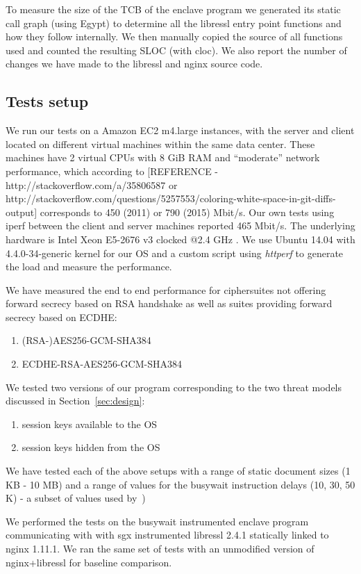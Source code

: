 \documentclass[../main.tex]{subfiles}
\begin{document}
To measure the size of the TCB of the enclave program we generated its
static call graph (using Egypt) to determine all the libressl entry
point functions and how they follow internally. We then manually
copied the source of all functions used and counted the resulting SLOC
(with cloc). We also report the number of changes we have made to the
libressl and nginx source code.

\subsection{Tests setup}
We run our tests on a Amazon EC2 m4.large instances, with the server
and client located on different virtual machines within the same data
center. These machines have 2 virtual CPUs with 8 GiB RAM and
``moderate'' network performance, which according to [REFERENCE -
http://stackoverflow.com/a/35806587 or
http://stackoverflow.com/questions/5257553/coloring-white-space-in-git-diffs-output]
corresponds to 450 (2011) or 790 (2015) Mbit/s. Our own tests using
iperf between the client and server machines reported 465 Mbit/s. The
underlying hardware is Intel Xeon E5-2676 v3 clocked @2.4 GHz
\cite{aws_instances}. We use Ubuntu 14.04 with 4.4.0-34-generic kernel
for our OS and a custom script using \textit{httperf} to generate the
load and measure the performance.

We have measured the end to end performance for ciphersuites not
offering forward secrecy based on RSA handshake as well as suites
providing forward secrecy based on ECDHE:
\begin{enumerate}
  \item (RSA-)AES256-GCM-SHA384
  \item ECDHE-RSA-AES256-GCM-SHA384
\end{enumerate}

We tested two versions of our program corresponding to the two threat
models discussed in Section~\ref{sec:design}:
\begin{enumerate}
  \item session keys available to the OS
  \item session keys hidden from the OS
\end{enumerate}

We have tested each of the above setups with a range of static
document sizes (1 KB - 10 MB) and a range of values for the busywait
instruction delays (10, 30, 50 K) - a subset of values used
by~\cite{Baumann14})

We performed the tests on the busywait instrumented enclave program
communicating with with sgx instrumented libressl 2.4.1 statically
linked to nginx 1.11.1. We ran the same set of tests with an
unmodified version of nginx+libressl for baseline comparison.
\end{document}
